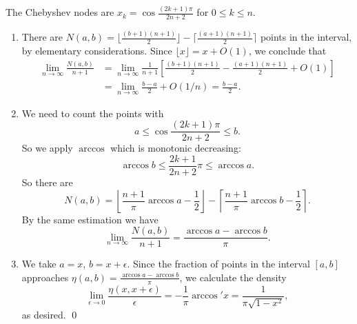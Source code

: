 \documentclass{homework}
\begin{document}
\begin{problem} The Chebyshev nodes are
\(x_k = \cos \frac{(2k+1)\pi}{2n+2}\) for \(0 \le k \le n\).
\begin{enumerate}[label=(\roman*)]
\item There are \(N(a,b) = \lfloor \frac{(b+1)(n+1)}{2} \rfloor - \lceil \frac{(a+1)(n+1)}{2} \rceil\) points in the interval, by elementary considerations. Since \(\lfloor x \rfloor = x + O(1)\), we conclude that
\[\begin{aligned}
\lim_{n\to\infty} \frac{N(a,b)}{n+1}
&= \lim_{n\to\infty} \frac1{n+1} \left[\frac{(b+1)(n+1)}{2} - \frac{(a+1)(n+1)}{2} + O(1)\right]\\
&= \lim_{n\to\infty} \frac{b-a}{2} + O(1/n) = \frac{b-a}{2}.
\end{aligned}\]
\item We need to count the points with \[a \le \cos \frac{(2k+1)\pi}{2n+2} \le b.\] So we apply \(\arccos\) which is monotonic decreasing:
\[\arccos b \le \frac{2k+1}{2n+2} \pi \le \arccos a.\] So there are
\[N(a,b) = \left\lfloor \frac{n+1}{\pi}\arccos a -\frac 12\right\rfloor - \left\lceil \frac{n+1}{\pi}\arccos b -\frac 12\right\rceil.\]
By the same estimation we have
\[\lim_{n\to\infty}\frac{N(a,b)}{n+1} = \frac{\arccos a - \arccos b}{\pi}.\]
\item We take \(a = x\), \(b = x + \epsilon\). Since the fraction of points in the interval \([a,b]\) approaches \(\eta(a,b) = \frac{\arccos a - \arccos b}{\pi}\), we calculate the density
\[\lim_{\epsilon\to0}\frac{\eta(x,x+\epsilon)}{\epsilon} = -\frac1\pi \arccos' x = \frac{1}{\pi \sqrt{1-x^2}},\] as desired. \qed
\end{enumerate}
\renewcommand{\qed}{}
\end{problem}
\end{document}
